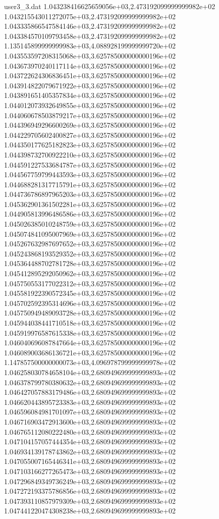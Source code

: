 \begin{filecontents}{user3_3.dat}
1.043238416625659056e+03,2.473192099999999982e+02
1.043215543011272075e+03,2.473192099999999982e+02
1.043335866547584146e+03,2.473192099999999982e+02
1.043384570109793458e+03,2.473192099999999982e+02
1.135145899999999983e+03,4.088928199999999720e+02
1.043553597208315068e+03,3.625785000000000196e+02
1.043673970240117114e+03,3.625785000000000196e+02
1.043722624306836451e+03,3.625785000000000196e+02
1.043914822079671922e+03,3.625785000000000196e+02
1.043891651405357834e+03,3.625785000000000196e+02
1.044012073932649855e+03,3.625785000000000196e+02
1.044060678503879217e+03,3.625785000000000196e+02
1.044396949296600269e+03,3.625785000000000196e+02
1.044229705602400827e+03,3.625785000000000196e+02
1.044350177625182823e+03,3.625785000000000196e+02
1.044398732700922210e+03,3.625785000000000196e+02
1.044591227533684787e+03,3.625785000000000196e+02
1.044567759799443593e+03,3.625785000000000196e+02
1.044688281317715791e+03,3.625785000000000196e+02
1.044736786897965203e+03,3.625785000000000196e+02
1.045362901361502281e+03,3.625785000000000196e+02
1.044905813996486586e+03,3.625785000000000196e+02
1.045026385010248759e+03,3.625785000000000196e+02
1.045074841095007969e+03,3.625785000000000196e+02
1.045267632987697652e+03,3.625785000000000196e+02
1.045243868193529352e+03,3.625785000000000196e+02
1.045364488702781728e+03,3.625785000000000196e+02
1.045412895292050962e+03,3.625785000000000196e+02
1.045750553177022312e+03,3.625785000000000196e+02
1.045581922390572345e+03,3.625785000000000196e+02
1.045702592395314696e+03,3.625785000000000196e+02
1.045750949489093728e+03,3.625785000000000196e+02
1.045944038441710518e+03,3.625785000000000196e+02
1.045919976587615338e+03,3.625785000000000196e+02
1.046040696087847664e+03,3.625785000000000196e+02
1.046089003686136721e+03,3.625785000000000196e+02
1.147857500000000073e+03,4.096978799999999978e+02
1.046258030784658104e+03,2.680949699999999893e+02
1.046378799780380632e+03,2.680949699999999893e+02
1.046427057883179486e+03,2.680949699999999893e+02
1.046620443895723383e+03,2.680949699999999893e+02
1.046596084981701097e+03,2.680949699999999893e+02
1.046716903472913600e+03,2.680949699999999893e+02
1.046765112080222480e+03,2.680949699999999893e+02
1.047104157057444354e+03,2.680949699999999893e+02
1.046934139178743862e+03,2.680949699999999893e+02
1.047055007165446341e+03,2.680949699999999893e+02
1.047103166277265473e+03,2.680949699999999893e+02
1.047296849349736249e+03,2.680949699999999893e+02
1.047272193375786856e+03,2.680949699999999893e+02
1.047393110857979309e+03,2.680949699999999893e+02
1.047441220474308238e+03,2.680949699999999893e+02

\end{filecontents}
